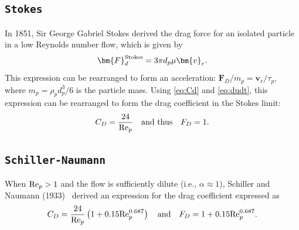 \documentclass[12pt]{article}
\newcommand{\code}[1]{\texttt{#1}}
\newcommand{\Rep}{\mbox{\rm Re}_p} %
\begin{document}
\begin{appendices}
\subsection{\code{Stokes}~\cite{stokes1851effect}}
In 1851, Sir George Gabriel Stokes derived the drag force for an isolated particle in a low Reynolds number flow, which is given by
\begin{equation}
\bm{F}_d^{\rm Stokes}=3\pi d_p\mu\bm{v}_r.
\end{equation}
This expression can be rearranged to form an acceleration: $\bm{F}_D/m_p=\bm{v}_r/\tau_p$, where $m_p=\rho_p d_p^3/6$ is the particle mass. Using \eqref{eq:Cd} and \eqref{eq:dudt}, this expression can be rearranged to form the drag coefficient in the Stokes limit:
\begin{equation}
C_D = \frac{24}{\Rep}\quad \text{and thus}\quad F_D=1.
\end{equation}

\subsection{\code{Schiller-Naumann}~\cite{schiller1933fundamental}}
When ${\rm Re}_p>1$ and the flow is sufficiently dilute (i.e., $\alpha\approx 1$), Schiller and Naumann (1933)~\cite{schiller1933fundamental} derived an expression for the drag coefficient expressed as
\begin{equation}
C_D=\frac{24}{\Rep}\left(1+0.15\Rep^{0.687}\right) \quad {\rm and}\quad F_D=1+0.15\Rep^{0.687}.
\end{equation}


\end{appendices}
\end{document}
